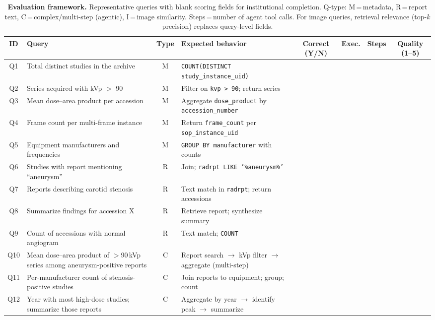 \documentclass[11pt]{article}
\begin{document}
\begin{table}[ht]
\centering
\caption{\textbf{Evaluation framework.} Representative queries with blank
scoring fields for institutional completion. Q-type:
M\,=\,metadata, R\,=\,report text, C\,=\,complex/multi-step (agentic),
I\,=\,image similarity. Steps\,=\,number of agent tool calls.
For image queries, retrieval relevance (top-$k$ precision) replaces query-level
fields.}
\label{tab:eval}
\scriptsize
\renewcommand{\arraystretch}{1.25}
\begin{tabularx}{\textwidth}{@{}c l c X c c c c@{}}
\toprule
\textbf{ID} & \textbf{Query} & \textbf{Type} &
\textbf{Expected behavior} & \textbf{Correct (Y/N)} &
\textbf{Exec.} & \textbf{Steps} & \textbf{Quality (1--5)} \\
\midrule
Q1 & Total distinct studies in the archive & M &
\texttt{COUNT(DISTINCT study\_instance\_uid)} & & & & \\
Q2 & Series acquired with kVp $>$ 90 & M &
Filter on \texttt{kvp > 90}; return series & & & & \\
Q3 & Mean dose--area product per accession & M &
Aggregate \texttt{dose\_product} by \texttt{accession\_number} & & & & \\
Q4 & Frame count per multi-frame instance & M &
Return \texttt{frame\_count} per \texttt{sop\_instance\_uid} & & & & \\
Q5 & Equipment manufacturers and frequencies & M &
\texttt{GROUP BY manufacturer} with counts & & & & \\
Q6 & Studies with report mentioning ``aneurysm'' & R &
Join; \texttt{radrpt LIKE '\%aneurysm\%'} & & & & \\
Q7 & Reports describing carotid stenosis & R &
Text match in \texttt{radrpt}; return accessions & & & & \\
Q8 & Summarize findings for accession X & R &
Retrieve report; synthesize summary & & & & \\
Q9 & Count of accessions with normal angiogram & R &
Text match; \texttt{COUNT} & & & & \\
Q10 & Mean dose--area product of $>$90\,kVp series among
aneurysm-positive reports & C &
Report search $\to$ kVp filter $\to$ aggregate (multi-step) & & & & \\
Q11 & Per-manufacturer count of stenosis-positive studies & C &
Join reports to equipment; group; count & & & & \\
Q12 & Year with most high-dose studies; summarize those reports & C &
Aggregate by year $\to$ identify peak $\to$ summarize & & & & \\

\end{tabularx}
\end{table}
\end{document}
